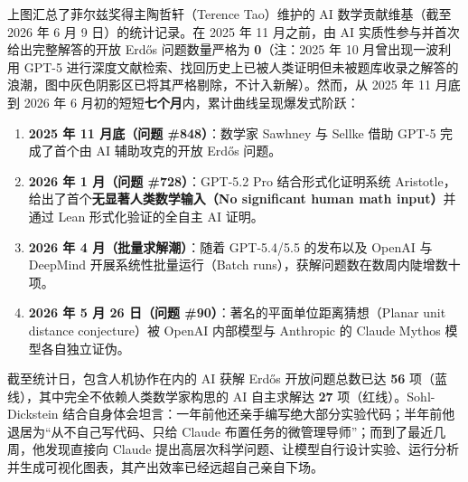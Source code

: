 \documentclass[a4paper]{article}
\begin{document}
上图汇总了菲尔兹奖得主陶哲轩（Terence Tao）维护的 AI 数学贡献维基（截至 2026 年 6 月 9 日）的统计记录。在 2025 年 11 月之前，由 AI 实质性参与并首次给出完整解答的开放 Erdős 问题数量严格为 \textbf{0}（注：2025 年 10 月曾出现一波利用 GPT-5 进行深度文献检索、找回历史上已被人类证明但未被题库收录之解答的浪潮，图中灰色阴影区已将其严格剔除，不计入新解）。然而，从 2025 年 11 月底到 2026 年 6 月初的短短\textbf{七个月}内，累计曲线呈现爆发式阶跃：
\begin{enumerate}
    \item \textbf{2025 年 11 月底（问题 \#848）}：数学家 Sawhney 与 Sellke 借助 GPT-5 完成了首个由 AI 辅助攻克的开放 Erdős 问题。
    \item \textbf{2026 年 1 月（问题 \#728）}：GPT-5.2 Pro 结合形式化证明系统 Aristotle，给出了首个\textbf{无显著人类数学输入（No significant human math input）}并通过 Lean 形式化验证的全自主 AI 证明。
    \item \textbf{2026 年 4 月（批量求解潮）}：随着 GPT-5.4/5.5 的发布以及 OpenAI 与 DeepMind 开展系统性批量运行（Batch runs），获解问题数在数周内陡增数十项。
    \item \textbf{2026 年 5 月 26 日（问题 \#90）}：著名的平面单位距离猜想（Planar unit distance conjecture）被 OpenAI 内部模型与 Anthropic 的 Claude Mythos 模型各自独立证伪。
\end{enumerate}

截至统计日，包含人机协作在内的 AI 获解 Erdős 开放问题总数已达 \textbf{56} 项（蓝线），其中完全不依赖人类数学家构思的 AI 自主求解达 \textbf{27} 项（红线）。Sohl-Dickstein 结合自身体会坦言：一年前他还亲手编写绝大部分实验代码；半年前他退居为“从不自己写代码、只给 Claude 布置任务的微管理导师”；而到了最近几周，他发现直接向 Claude 提出高层次科学问题、让模型自行设计实验、运行分析并生成可视化图表，其产出效率已经远超自己亲自下场。
\end{document}
